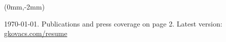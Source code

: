 \documentclass[margin,line]{resume}
\begin{document}
\vspace{-20mm}

\begin{textblock*}{17cm}(0mm,-2mm) %
\begin{small}
\begin{center}
   \today. Publications and press coverage on page 2. Latest version: \href{https://www.gkovacs.com/resume.pdf}{gkovacs.com/resume}
\end{center}
\end{small}

\end{textblock*}

\vspace{-5.0mm}

\end{document}
